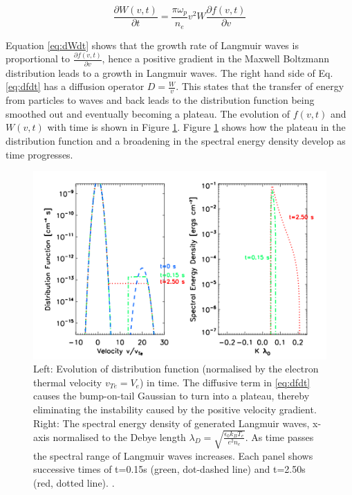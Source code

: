 \begin{equation}\label{eq:dWdt}
    \frac{\partial W(v,t)}{\partial t}= \frac{\pi \omega_p}{n_e} v^2 W \frac{\partial f(v,t)}{\partial v}
\end{equation}

Equation \ref{eq:dWdt} shows that the growth rate of Langmuir waves is proportional to $\frac{\partial f(v,t)}{\partial v}$, hence a positive gradient in the Maxwell Boltzmann distribution leads to a growth in Langmuir waves. The right hand side of Eq. \ref{eq:dfdt} has a diffusion operator $D=\frac{W}{v}$. This states that the transfer of energy from particles to waves and back leads to the distribution function being smoothed out and eventually becoming a plateau. The evolution of $f(v,t)$ and $W(v,t)$ with time is shown in Figure \ref{fig:Lwavegrowth}. Figure \ref{fig:Lwavegrowth} shows how the plateau in the distribution function and a broadening in the spectral energy density develop as time progresses.

\begin{figure}
    \centering
    \includegraphics[width=0.75\columnwidth]{Images/L_wave_growth.png}
    \caption[Langmuir wave distriburtion function and spectral energy density.]{Left: Evolution of distribution function (normalised by the electron thermal velocity $v_{Te}=V_e$) in time. The diffusive term in \ref{eq:dfdt} causes the bump-on-tail Gaussian to turn into a plateau, thereby eliminating the instability caused by the positive velocity gradient. Right: The spectral energy density of generated Langmuir waves, x-axis normalised to the Debye length $\lambda_D=\sqrt{\frac{\epsilon_0 k_B T_e}{e^2 n_e}}$. As time passes the spectral range of Langmuir waves increases. Each panel shows successive times of t=0.15s (green, dot-dashed line) and t=2.50s (red, dotted line). \citep[Figure taken from][]{Reid2014}.} %
    \label{fig:Lwavegrowth}
\end{figure}

